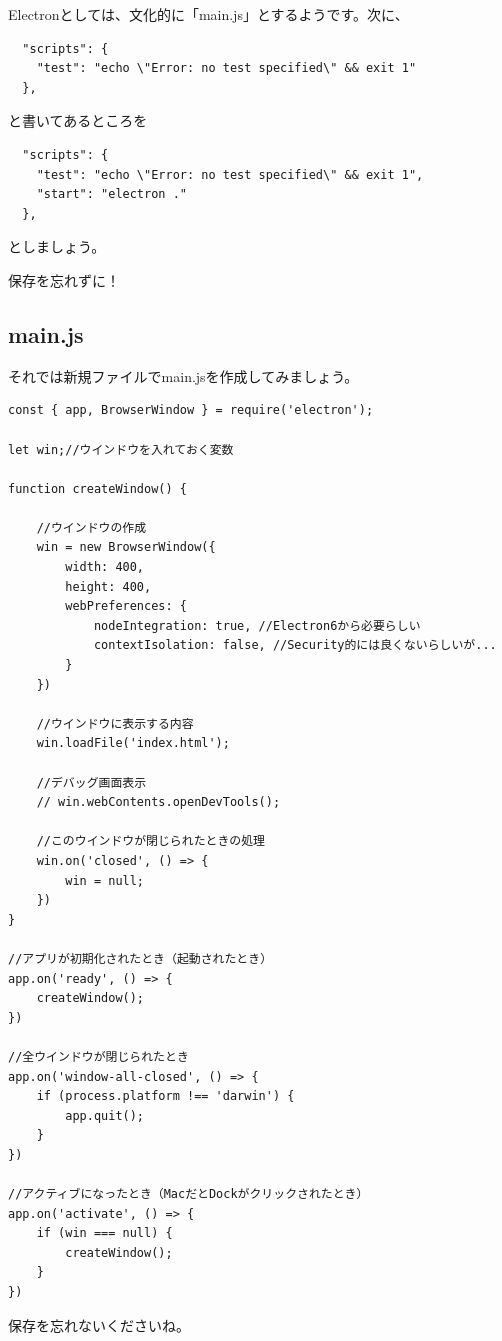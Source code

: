 \documentclass[mingoth,11pt,a4j,uplatex]{jsarticle}
\begin{document}
Electronとしては、文化的に「main.js」とするようです。次に、

\begin{verbatim}
  "scripts": {
    "test": "echo \"Error: no test specified\" && exit 1"
  },
\end{verbatim}
と書いてあるところを
\begin{verbatim}
  "scripts": {
    "test": "echo \"Error: no test specified\" && exit 1",
    "start": "electron ."
  },
\end{verbatim}
としましょう。




保存を忘れずに！

\subsection{main.js}
それでは新規ファイルでmain.jsを作成してみましょう。

\begin{lstlisting}[caption=Hello World：main.js]
const { app, BrowserWindow } = require('electron');

let win;//ウインドウを入れておく変数

function createWindow() {

    //ウインドウの作成
    win = new BrowserWindow({
        width: 400,
        height: 400,
        webPreferences: {
            nodeIntegration: true, //Electron6から必要らしい
            contextIsolation: false, //Security的には良くないらしいが...
        }
    })

    //ウインドウに表示する内容
    win.loadFile('index.html');

    //デバッグ画面表示
    // win.webContents.openDevTools();

    //このウインドウが閉じられたときの処理
    win.on('closed', () => {
        win = null;
    })
}

//アプリが初期化されたとき（起動されたとき）
app.on('ready', () => {
    createWindow();
})

//全ウインドウが閉じられたとき
app.on('window-all-closed', () => {
    if (process.platform !== 'darwin') {
        app.quit();
    }
})

//アクティブになったとき（MacだとDockがクリックされたとき）
app.on('activate', () => {
    if (win === null) {
        createWindow();
    }
})
\end{lstlisting}

保存を忘れないくださいね。
\end{document}
